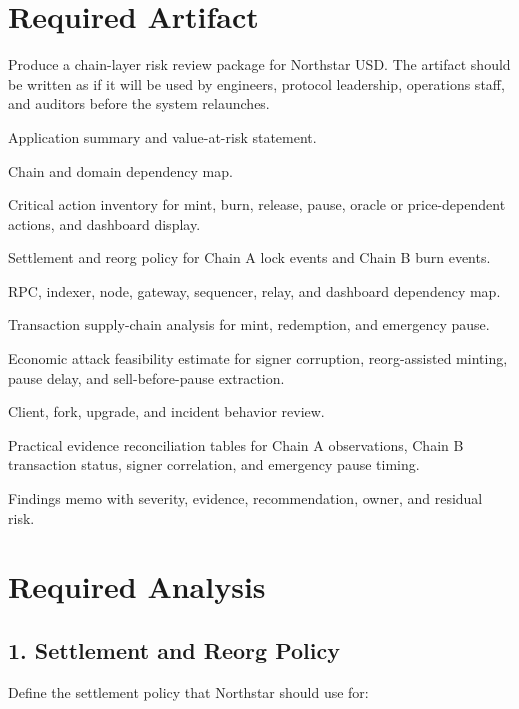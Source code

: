 \section*{Required Artifact}

Produce a chain-layer risk review package for Northstar USD. The artifact should be written as if it will be used by engineers, protocol leadership, operations staff, and auditors before the system relaunches.

\begin{artifactbox}
\begin{artifactchecklist}
\item Application summary and value-at-risk statement.
\item Chain and domain dependency map.
\item Critical action inventory for mint, burn, release, pause, oracle or price-dependent actions, and dashboard display.
\item Settlement and reorg policy for Chain A lock events and Chain B burn events.
\item RPC, indexer, node, gateway, sequencer, relay, and dashboard dependency map.
\item Transaction supply-chain analysis for mint, redemption, and emergency pause.
\item Economic attack feasibility estimate for signer corruption, reorg-assisted minting, pause delay, and sell-before-pause extraction.
\item Client, fork, upgrade, and incident behavior review.
\item Practical evidence reconciliation tables for Chain A observations, Chain B transaction status, signer correlation, and emergency pause timing.
\item Findings memo with severity, evidence, recommendation, owner, and residual risk.
\end{artifactchecklist}
\end{artifactbox}

\section*{Required Analysis}

\subsection*{1. Settlement and Reorg Policy}

Define the settlement policy that Northstar should use for:

